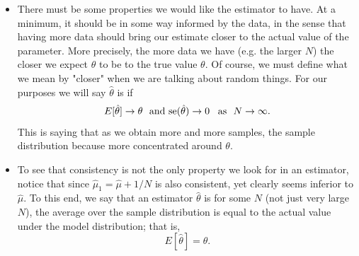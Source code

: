 \begin{itemize}
\item There must be some properties we would like the estimator to have. At a minimum, it should be in some way informed by the data, in the sense that having more data should bring our estimate closer to the actual value of the parameter. More precisely, the more data we have (e.g. the larger $N$) the closer we expect $\hat{\theta}$ to be to the true value $\theta$. Of course, we must define what we mean by "closer" when we are talking about random things. 
For our purposes we will say $\hat{\theta}$ is  if 
\begin{equation*}
E[\hat{\theta}] \to \theta\,\,\text{ and } {\rm se}(\hat{\theta})  \to 0 \,\,\,\text{ as }\,\, N\to \infty. 
\end{equation*}
This is saying that as we obtain more and more samples, the sample distribution because more concentrated around $\theta$. 


%
%
\item To see that consistency is not the only property we look for in an estimator, notice that since $\hat{\mu}_1 = \hat{\mu} + 1/N$ is also consistent, yet clearly seems inferior to $\hat{\mu}$. To this end, we say that an estimator $\hat{\theta}$ is  for some $N$ (not just very large $N$), the average over the sample distribution is equal to the actual value under the model distribution; that is, 
\begin{equation*}
E[\hat{\theta}] = \theta. 
\end{equation*} 


\end{itemize}
